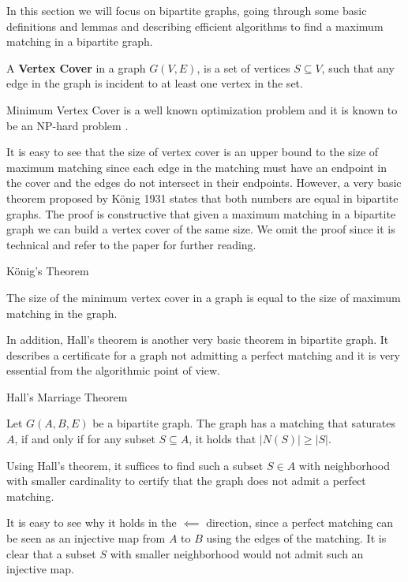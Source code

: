 In this section we will focus on bipartite graphs, going through some basic definitions and lemmas and describing efficient algorithms to find a maximum matching in a bipartite graph.
\begin{definition}
	A \textbf{Vertex Cover} in a graph $G(V, E)$, is a set of vertices $S \subseteq V$, such that any edge in the graph is incident to at least one vertex in the set.
\end{definition}
Minimum Vertex Cover is a well known optimization problem and it is known to be an NP-hard problem \cite{karp1972reducibility}.

It is easy to see that the size of vertex cover is an upper bound to the size of maximum matching since each edge in the matching must have an endpoint in the cover and the edges do not intersect in their endpoints. However, a very basic theorem proposed by König 1931 \cite{konig1931graphen} states that both numbers are equal in bipartite graphs. The proof is constructive that given a maximum matching in a bipartite graph we can build  a vertex cover of the same size. We omit the proof since it is technical and refer to the paper for further reading.

\begin{theorem}König's Theorem

	The size of the minimum vertex cover in a graph is equal to the size of maximum matching in the graph.
\end{theorem}

In addition, Hall's theorem is another very basic theorem in bipartite graph. It describes a certificate for a graph not admitting a perfect matching and it is very essential from the algorithmic point of view.
\begin{theorem}Hall's Marriage Theorem

	Let $G(A, B, E)$ be a bipartite graph. The graph has a matching that saturates $A$, if and only if for any subset $S \subseteq A$, it holds that $|N(S)| \geq |S|$.
\end{theorem}
Using Hall's theorem, it suffices to find such a subset $S \in A$ with neighborhood with smaller cardinality to certify that the graph does not admit a perfect matching.

It is easy to see why it holds in the $\impliedby$ direction, since a perfect matching can be seen as an injective map from $A$ to $B$ using the edges of the matching. It is clear that a subset $S$ with smaller neighborhood would not admit such an injective map.

